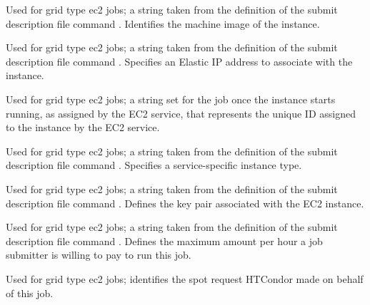 \begin{description}
\item[\AdAttr{EC2AmiID}:] 
Used for grid type ec2 jobs;
a string taken from the definition of the submit description file command
.
Identifies the machine image of the instance.

\item[\AdAttr{EC2ElasticIp}:] 
Used for grid type ec2 jobs;
a string taken from the definition of the submit description file command
.
Specifies an Elastic IP address to associate with the instance.

\item[\AdAttr{EC2InstanceName}:] 
Used for grid type ec2 jobs;
a string set for the job once the instance starts running, 
as assigned by the EC2 service, 
that represents the unique ID assigned to the instance by the EC2 service.

\item[\AdAttr{EC2InstanceType}:] 
Used for grid type ec2 jobs;
a string taken from the definition of the submit description file command
.
Specifies a service-specific instance type.

\item[\AdAttr{EC2KeyPair}:] 
Used for grid type ec2 jobs;
a string taken from the definition of the submit description file command
.
Defines the key pair associated with the EC2 instance. 

\item[\AdAttr{EC2SpotPrice}:] 
Used for grid type ec2 jobs;
a string taken from the definition of the submit description file command
.
Defines the maximum amount per hour a job submitter is willing to 
pay to run this job.

\item[\AdAttr{EC2SpotRequestID}:] 
Used for grid type ec2 jobs;
identifies the spot request HTCondor made on behalf of this job.


\end{description}

